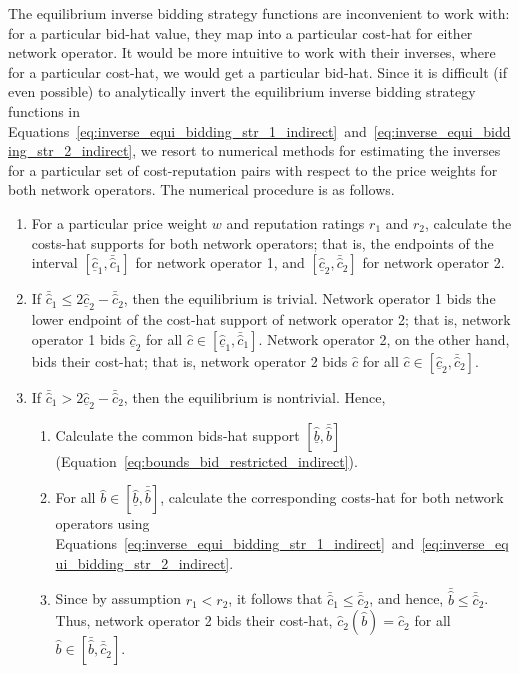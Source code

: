 The equilibrium inverse bidding strategy functions are inconvenient to work with: for a particular bid-hat value, they map into a particular cost-hat for either network operator. It would be more intuitive to work with their inverses, where for a particular cost-hat, we would get a particular bid-hat. Since it is difficult (if even possible) to analytically invert the equilibrium inverse bidding strategy functions in Equations~\eqref{eq:inverse_equi_bidding_str_1_indirect}~and~\eqref{eq:inverse_equi_bidding_str_2_indirect}, we resort to numerical methods for estimating the inverses for a particular set of cost-reputation pairs with respect to the price weights for both network operators. The numerical procedure is as follows.
\begin{enumerate}
  \item For a particular price weight $w$ and reputation ratings $r_1$ and $r_2$, calculate the costs-hat supports for both network operators; that is, the endpoints of the interval $[\underline{\hat{c}}_1, \bar{\hat{c}}_1]$ for network operator 1, and $[\underline{\hat{c}}_2, \bar{\hat{c}}_2]$ for network operator 2.
  \item If $\bar{\hat{c}}_1 \le 2\underline{\hat{c}}_2 - \bar{\hat{c}}_2$, then the equilibrium is trivial. Network operator 1 bids the lower endpoint of the cost-hat support of network operator 2; that is, network operator 1 bids $\underline{\hat{c}}_2$ for all $\hat{c}\in [\underline{\hat{c}}_1, \bar{\hat{c}}_1]$. Network operator 2, on the other hand, bids their cost-hat; that is, network operator 2 bids $\hat{c}$ for all $\hat{c}\in [\underline{\hat{c}}_2, \bar{\hat{c}}_2]$.
  \item If $\bar{\hat{c}}_1 > 2\underline{\hat{c}}_2 - \bar{\hat{c}}_2$, then the equilibrium is nontrivial. Hence,
  \begin{enumerate}
    \item Calculate the common bids-hat support $[\underline{\hat{b}}, \bar{\hat{b}}]$ (Equation~\eqref{eq:bounds_bid_restricted_indirect}).
    \item For all $\hat{b}\in [\underline{\hat{b}}, \bar{\hat{b}}]$, calculate the corresponding costs-hat for both network operators using Equations~\eqref{eq:inverse_equi_bidding_str_1_indirect}~and~\eqref{eq:inverse_equi_bidding_str_2_indirect}.
    \item Since by assumption $r_1 < r_2$, it follows that $\bar{\hat{c}}_1 \le \bar{\hat{c}}_2$, and hence, $\bar{\hat{b}}\le \bar{\hat{c}}_2$. Thus, network operator 2 bids their cost-hat, $\hat{c}_2(\hat{b}) = \hat{c}_2$  for all $\hat{b}\in [\bar{\hat{b}}, \bar{\hat{c}}_2]$.
  \end{enumerate}
\end{enumerate}

